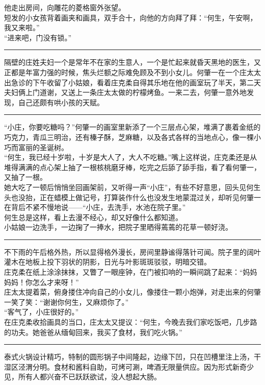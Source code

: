 \documentclass[oneside,11pt]{memoir} %
\begin{document}
\begin{CJK}{UTF8}{gbsn}
     他走出房间，向雕花的菱格窗外张望。\\\indent
     短发的小女孩背着画夹和画具，双手合十，向他的方向拜了拜：“何生，午安啊，我又来啦。”\\\indent
     “进来吧，门没有锁。”\\\indent
\rule{-3pt}{30pt}
     隔壁的庄姓夫妇一个是常年不在家的生意人，一个是忙起来就昏天黑地的医生，又正都是年富力强的时候，焦头烂额之际难免顾及不到小女儿。何肇一在一个庄太太出急诊的下午收留了小姑娘，看着庄克柔自得其乐地在他的画室玩了半天，第二天夫妇俩上门道谢，又送上一条庄太太做的柠檬烤鱼。一来二去，何肇一意外地发现，自己还颇有哄小孩的天赋。\\\indent
\rule{-3pt}{30pt}
     “小庄，你要吃糖吗？”何肇一的画室里新添了一个三层点心架，堆满了裹着金纸的巧克力，青瓜三明治，还有榛子酥，芝麻糖，以及各式各样的当地点心，像一棵小巧而富丽的圣诞树。\\\indent
     “何生，我已经十岁啦，十岁是大人了，大人不吃糖。”嘴上这样说，庄克柔还是从堆得满满的点心架上抽了一根核桃磨牙棒，吃完之后舔了舔手指，看了看何肇一，又抽了一根。\\\indent
     她大吃了一顿后悄悄坐回画架前，又听得一声“小庄”，有些不好意思，回头见何生头也没抬，正在蜡模上做记号，打算装作什么也没发生地蒙混过关，却听见何肇一在背后不紧不慢地说——“小庄，去洗手，水池在院子里。”\\\indent
     何生总是这样，看上去漫不经心，却又好像什么都知道。\\\indent
     小姑娘一边洗手，一边掬了一捧水，把院子里晒得蔫蔫的花草一顿好浇。\\\indent
\rule{-3pt}{30pt}
     不下雨的午后格外热，所以显得格外漫长，房间里静谧得落针可闻。院子里的阔叶灌木在地板上投下羽状的阴影，日光与叶影斑斑驳驳，明暗交错。\\\indent
     庄克柔在纸上涂涂抹抹，又瞥了一眼座钟，在门被扣响的一瞬间跳了起来：“妈妈妈妈！你怎么才来呀！”\\\indent
     庄太太提着菜，俯身搂住冲向自己的小女儿，像搂住一颗小炮弹，对走出来的何肇一笑了笑：“谢谢你何生，又麻烦你了。”\\\indent
     “客气了，小庄很好的。”\\\indent
     在庄克柔收拾画具的当口，庄太太又提议：“何生，今晚去我们家吃饭吧，几步路的功夫。她爸爸从缅甸回来，我买了食材，我们吃火锅。”\\\indent
\rule{-3pt}{30pt}
     泰式火锅设计精巧，特制的圆形锅子中间隆起，边缘下凹，只在凹槽里注上汤，干湿区泾渭分明。食材和酱料自助，可烤可涮，啤酒无限量供应。因为形式新奇少见，所有人都兴奋不已跃跃欲试，没人想起大肠。\\\indent

\end{CJK}
\end{document}
